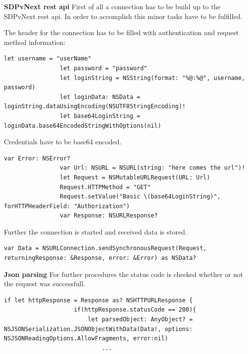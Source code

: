 			\textbf{SDPvNext rest api}
				First of all a connection has to be build up to the SDPvNext rest api. In order to accomplish this minor tasks have to be fulfilled. 


				The header for the connection has to be filled with authentication and request method information:

				\begin{lstlisting}[caption=Authentication Setup] 
	    		let username = "userName"
	    		let password = "password"
	    		let loginString = NSString(format: "%@:%@", username, password)
	    		let loginData: NSData = loginString.dataUsingEncoding(NSUTF8StringEncoding)!
	    		let base64LoginString = loginData.base64EncodedStringWithOptions(nil) 
				\end{lstlisting} 

				Credentials have to be base64 encoded.

				\begin{lstlisting}[caption=Request Setup] 
				var Error: NSError?
	        	var Url: NSURL = NSURL(string: "here comes the url")!
	        	let Request = NSMutableURLRequest(URL: Url)
	        	Request.HTTPMethod = "GET"
	        	Request.setValue("Basic \(base64LoginString)", forHTTPHeaderField: "Authorization")
	        	var Response: NSURLResponse?
				\end{lstlisting}

				Further the connection is started and received data is stored.

				\begin{lstlisting}[caption=Create connection to receive json]
				var Data = NSURLConnection.sendSynchronousRequest(Request, returningResponse: &Response, error: &Error) as NSData?
	        	\end{lstlisting}

	        	\pagebreak

			\textbf{Json parsing}
				For further procedures the status code is checked whether or not the request was successfull.

	        	\begin{lstlisting}[caption=Check whether request was successfull]
	        	if let httpResponse = Response as? NSHTTPURLResponse {
	            	if(httpResponse.statusCode == 200){
	                	let parsedObject: AnyObject? = NSJSONSerialization.JSONObjectWithData(Data!, options: NSJSONReadingOptions.AllowFragments, error:nil)
	                		...
	        	\end{lstlisting}


